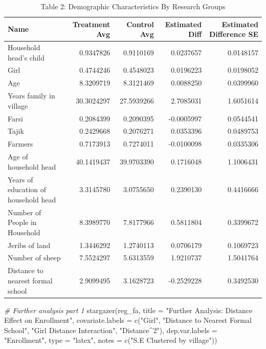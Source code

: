 \documentclass[
]{article}
\newenvironment{Shaded}{\begin{snugshade}}{\end{snugshade}}
\newcommand{\AttributeTok}[1]{\textcolor[rgb]{0.77,0.63,0.00}{#1}}
\newcommand{\CommentTok}[1]{\textcolor[rgb]{0.56,0.35,0.01}{\textit{#1}}}
\newcommand{\FunctionTok}[1]{\textcolor[rgb]{0.00,0.00,0.00}{#1}}
\newcommand{\NormalTok}[1]{#1}
\newcommand{\StringTok}[1]{\textcolor[rgb]{0.31,0.60,0.02}{#1}}
\begin{document}
\begin{table}

\caption{\label{tab:unnamed-chunk-1}Table 2: Demographic Characteristics By Research Groups}
\centering
\begin{tabular}[t]{l|r|r|r|r}
\hline
Name & Treatment Avg & Control Avg & Estimated Diff & Estimated Difference SE\\
\hline
Household head's child & 0.9347826 & 0.9110169 & 0.0237657 & 0.0148157\\
\hline
Girl & 0.4744246 & 0.4548023 & 0.0196223 & 0.0198052\\
\hline
Age & 8.3209719 & 8.3121469 & 0.0088250 & 0.0399960\\
\hline
Years family in village & 30.3024297 & 27.5939266 & 2.7085031 & 1.6051614\\
\hline
Farsi & 0.2084399 & 0.2090395 & -0.0005997 & 0.0544541\\
\hline
Tajik & 0.2429668 & 0.2076271 & 0.0353396 & 0.0489753\\
\hline
Farmers & 0.7173913 & 0.7274011 & -0.0100098 & 0.0335306\\
\hline
Age of household head & 40.1419437 & 39.9703390 & 0.1716048 & 1.1006431\\
\hline
Years of education of household head & 3.3145780 & 3.0755650 & 0.2390130 & 0.4416666\\
\hline
Number of People in Household & 8.3989770 & 7.8177966 & 0.5811804 & 0.3399672\\
\hline
Jeribs of land & 1.3446292 & 1.2740113 & 0.0706179 & 0.1069723\\
\hline
Number of sheep & 7.5524297 & 5.6313559 & 1.9210737 & 1.5041764\\
\hline
Distance to nearest formal school & 2.9099495 & 3.1628723 & -0.2529228 & 0.3492530\\
\hline
\end{tabular}
\end{table}

\begin{Shaded}
\begin{Highlighting}[]
\CommentTok{\# Further analysis part 1}
\FunctionTok{stargazer}\NormalTok{(reg\_fa, }\AttributeTok{title =} \StringTok{"Further Analysis: Distance Effect on Enrollment"}\NormalTok{,}
          \AttributeTok{covariate.labels =} \FunctionTok{c}\NormalTok{(}\StringTok{"Girl"}\NormalTok{, }\StringTok{"Distance to Nearest Formal School"}\NormalTok{,}
                               \StringTok{"Girl Distance Interaction"}\NormalTok{, }\StringTok{"Distance\^{}2"}\NormalTok{),}
          \AttributeTok{dep.var.labels =} \StringTok{"Enrollment"}\NormalTok{,}
          \AttributeTok{type =} \StringTok{"latex"}\NormalTok{, }\AttributeTok{notes =} \FunctionTok{c}\NormalTok{(}\StringTok{"S.E Clustered by village"}\NormalTok{))}
\end{Highlighting}
\end{Shaded}
\end{document}
